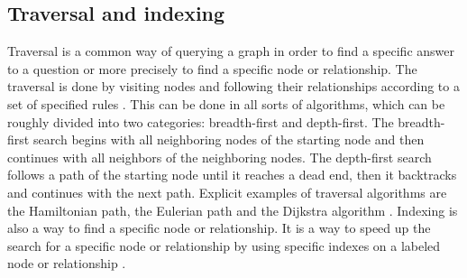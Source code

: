 \subsection{Traversal and indexing}\label{subsec:traversal-and-indexing}
Traversal is a common way of querying a graph in order to find a specific answer to a question or more precisely to find a
specific node or relationship.
The traversal is done by visiting nodes and following their relationships according to a set of specified rules \parencite[compare P.7]{PractivalNeo4j}.
This can be done in all sorts of algorithms, which can be roughly divided into two categories: breadth-first and depth-first.
The breadth-first  search begins with all neighboring nodes of the starting node and then continues with all neighbors of the neighboring nodes.
The depth-first search follows a path of the starting node until it reaches a dead end, then it backtracks and continues with the next path.
Explicit examples of traversal algorithms are the Hamiltonian path, the Eulerian path and the Dijkstra algorithm \parencite[compare]{juypiter:Graph}.
Indexing is also a way to find a specific node or relationship.
It is a way to speed up the search for a specific node or relationship by using specific indexes on a labeled node or relationship \parencite[compare P.7]{PractivalNeo4j}.